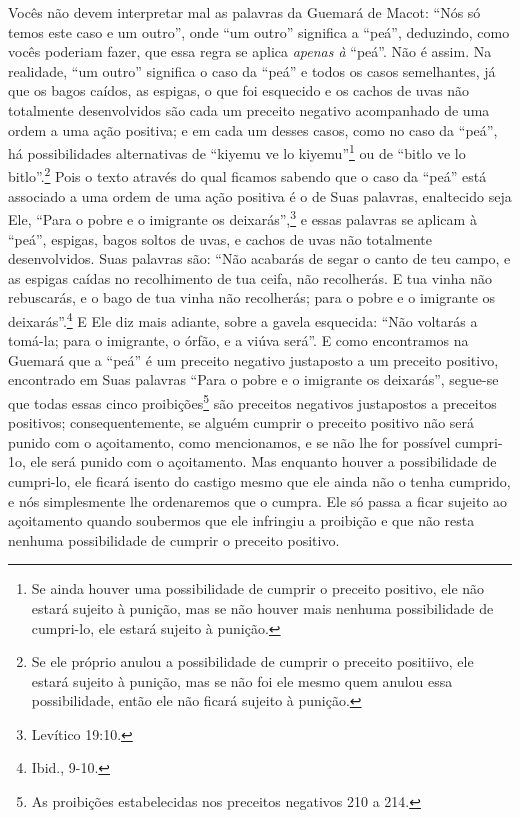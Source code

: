 Vocês não devem interpretar mal as palavras da Guemará de Macot: ``Nós
só temos este caso e um outro'', onde ``um outro'' significa a ``peá'',
deduzindo, como vocês poderiam fazer, que essa regra se aplica
\emph{apenas à} ``peá''. Não é assim. Na realidade, ``um outro''
significa o caso da ``peá'' e todos os casos semelhantes, já que os
bagos caídos, as espigas, o que foi esquecido e os cachos de uvas não
totalmente desenvolvidos são cada um preceito negativo acompanhado de
uma ordem a uma ação positiva; e em cada um desses casos, como no caso
da ``peá'', há possibilidades alternativas de ``kiyemu ve lo
kiyemu''\footnote{Se ainda houver uma possibilidade de cumprir o preceito positivo, ele
  não estará sujeito à punição, mas se não houver mais nenhuma
  possibilidade de cumpri-lo, ele estará sujeito à punição.} ou de ``bitlo ve lo
bitlo''.\footnote{Se ele próprio anulou a possibilidade de cumprir o preceito
  positiivo, ele estará sujeito à punição, mas se não foi ele mesmo
  quem anulou essa possibilidade, então ele não ficará sujeito à
  punição.} Pois o texto através do qual ficamos
sabendo que o caso da ``peá'' está associado a uma ordem de uma ação
positiva é o de Suas palavras, enaltecido seja Ele, ``Para o pobre e o
imigrante os deixarás'',\footnote{Levítico 19:10.} e essas palavras se aplicam à
``peá'', espigas, bagos soltos de uvas, e cachos de uvas não totalmente
desenvolvidos. Suas palavras são: ``Não acabarás de segar o canto de teu
campo, e as espigas caídas no recolhimento de tua ceifa, não recolherás.
E tua vinha não rebuscarás, e o bago de tua vinha não recolherás; para
o pobre e o imigrante os deixarás''.\footnote{Ibid., 9-10.} E Ele diz mais
adiante, sobre a gavela esquecida: ``Não voltarás a tomá-la; para o
imigrante, o órfão, e a viúva será''. E como encontramos na Guemará que
a ``peá'' é um preceito negativo justaposto a um preceito positivo,
encontrado em Suas palavras ``Para o pobre e o imigrante os deixarás'',
segue-se que todas essas cinco proibições\footnote{As proibições estabelecidas nos preceitos negativos 210 a 214.} são
preceitos negativos justapostos a preceitos positivos;
consequentemente, se alguém cumprir o preceito positivo não será punido
com o açoitamento, como mencionamos, e se não lhe for possível
cumpri-1o, ele será punido com o açoitamento. Mas enquanto houver a
possibilidade de cumpri-lo, ele ficará isento do castigo mesmo que ele
ainda não o tenha cumprido, e nós simplesmente lhe ordenaremos que o
cumpra. Ele só passa a ficar sujeito ao açoitamento quando soubermos
que ele infringiu a proibição e que não resta nenhuma possibilidade de
cumprir o preceito positivo.

